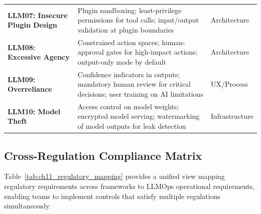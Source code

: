 \begin{table}[t]
\begin{tabularx}{\linewidth}{@{}>{\raggedright\arraybackslash}p{3.8cm}>{\raggedright\arraybackslash}X>{\raggedright\arraybackslash}p{3.2cm}@{}}
\addlinespace[2pt]
\textbf{LLM07: Insecure Plugin Design} & Plugin sandboxing; least-privilege permissions for tool calls; input/output validation at plugin boundaries & Architecture \\
\addlinespace[2pt]
\textbf{LLM08: Excessive Agency} & Constrained action spaces; human-approval gates for high-impact actions; output-only mode by default & Architecture \\
\addlinespace[2pt]
\textbf{LLM09: Overreliance} & Confidence indicators in outputs; mandatory human review for critical decisions; user training on AI limitations & UX/Process \\
\addlinespace[2pt]
\textbf{LLM10: Model Theft} & Access control on model weights; encrypted model serving; watermarking of model outputs for leak detection & Infrastructure \\
\bottomrule
\end{tabularx}
\end{table}

\subsection{Cross-Regulation Compliance Matrix}\label{sec:ch11_compliance_matrix}

Table~\ref{tab:ch11_regulatory_mapping} provides a unified view mapping regulatory requirements across frameworks to LLMOps operational requirements, enabling teams to implement controls that satisfy multiple regulations simultaneously.

